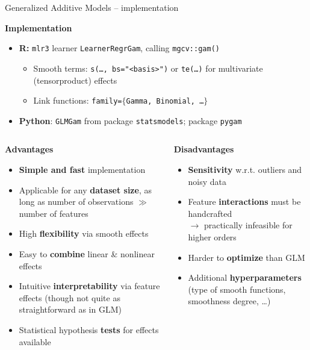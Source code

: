 \documentclass[11pt,compress,t,notes=noshow, xcolor=table]{beamer}
\newcommand{\highlight}[1]{\textcolor{hlcol}{\textbf{#1}}}
\newcommand{\positem}{\item[\textcolor{hlcol}{$\bm{+}$}]}
\newcommand{\negitem}{\item[\textcolor{hlcol}{$\bm{-}$}]}
\begin{document}
\begin{vbframe}{Generalized Additive Models -- implementation}

  \highlight{Implementation}

\begin{itemize}
  \item \textbf{R:} \texttt{mlr3} learner \texttt{LearnerRegrGam},
    calling \texttt{mgcv::gam()}
  \begin{itemize}
      \item Smooth terms: \texttt{s(\dots, bs="<basis>")} or \texttt{te(\dots)}
      for multivariate (tensorproduct) effects
      \item Link functions: \texttt{family=$\{$Gamma, Binomial, \dots $\}$}
  \end{itemize}
    \item \textbf{Python}: \texttt{GLMGam} from package \texttt{statsmodels};
    package \texttt{pygam}
\end{itemize}

\medskip
\begin{columns}[onlytextwidth]
  \begin{column}{0.5\textwidth}
    \highlight{Advantages}

    \begin{itemize}
      \positem \textbf{Simple and fast} implementation
      \positem Applicable for any \textbf{dataset size}, as long as number of
      observations $\gg$ number of features
      \positem High \textbf{flexibility} via smooth effects
      \positem Easy to \textbf{combine} linear \& nonlinear effects
      \positem Intuitive \textbf{interpretability} via feature effects (though
      not quite as straightforward as in GLM)
      \positem Statistical hypothesis \textbf{tests} for effects available
    \end{itemize}
  \end{column}

  \begin{column}{0.5\textwidth}
    \highlight{Disadvantages}

    \begin{itemize}
      \negitem \textbf{Sensitivity} w.r.t. outliers and noisy data
      \negitem Feature \textbf{interactions} must be handcrafted\\
      $\rightarrow$ practically infeasible for higher orders
      \negitem Harder to \textbf{optimize} than GLM
      \negitem Additional \textbf{hyperparameters} (type of smooth functions,
      smoothness degree, \dots)
    \end{itemize}
  \end{column}
\end{columns}
  
\end{vbframe}
\end{document}
